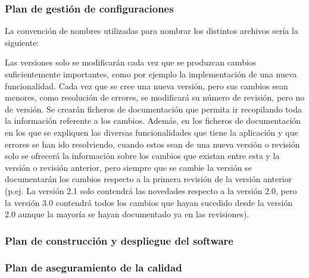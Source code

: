 \documentclass{article}
\begin{document}
\subsubsection{Plan de gestión de configuraciones}
La convención de nombres utilizadas para nombrar los distintos archivos sería la siguiente: 
\begin{figure}[H]
\end{figure}
Las versiones solo se modificarán cada vez que se produzcan cambios suficientemente importantes, como por ejemplo la implementación de una nueva funcionalidad. 
Cada vez que se cree una nueva versión, pero sus cambios sean menores, como resolución de errores, se modificará su número de revisión, pero no de versión. 
Se crearán ficheros de documentación que permita ir recopilando toda la información referente a los cambios.
Además, en los ficheros de documentación en los que se expliquen las diversas funcionalidades que tiene la aplicación y que errores se han ido resolviendo, cuando estos sean de una nueva versión o revisión solo se ofrecerá la información sobre los cambios que existan entre esta y la versión o revisión anterior, pero siempre que se cambie la versión se documentarán los cambios respecto a la primera revisión de la versión anterior (p.ej. La versión 2.1 solo contendrá las novedades respecto a la versión 2.0, pero la versión 3.0 contendrá todos los cambios que hayan sucedido desde la versión 2.0 aunque la mayoría se hayan documentado ya en las revisiones). 

\newpage
\subsubsection{Plan de construcción y despliegue del software}

\subsubsection{Plan de aseguramiento de la calidad}

\newpage
\end{document}
